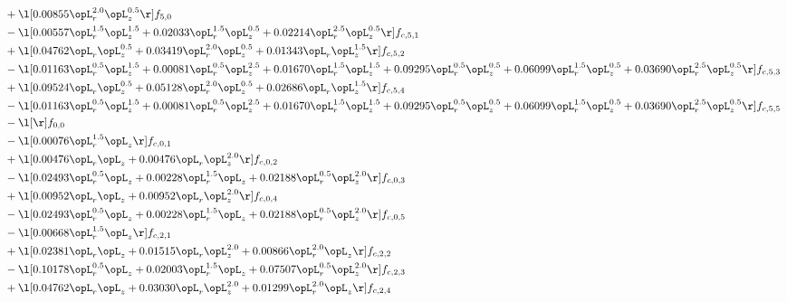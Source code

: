 \begin{alignat}{2}
& + \l[  0.00855 \opL_r^{2.0} \opL_z^{0.5}  \r] f_{5,0} \nonumber \\ 
& - \l[  0.00557 \opL_r^{1.5} \opL_z^{1.5} +  0.02033 \opL_r^{1.5} \opL_z^{0.5} +  0.02214 \opL_r^{2.5} \opL_z^{0.5}  \r] f_{c,5,1} \nonumber \\ 
& + \l[  0.04762 \opL_r \opL_z^{0.5} +  0.03419 \opL_r^{2.0} \opL_z^{0.5} +  0.01343 \opL_r \opL_z^{1.5}  \r] f_{c,5,2} \nonumber \\ 
& - \l[  0.01163 \opL_r^{0.5} \opL_z^{1.5} +  0.00081 \opL_r^{0.5} \opL_z^{2.5} +  0.01670 \opL_r^{1.5} \opL_z^{1.5} +  0.09295 \opL_r^{0.5} \opL_z^{0.5} +  0.06099 \opL_r^{1.5} \opL_z^{0.5} +  0.03690 \opL_r^{2.5} \opL_z^{0.5}  \r] f_{c,5,3} \nonumber \\ 
& + \l[  0.09524 \opL_r \opL_z^{0.5} +  0.05128 \opL_r^{2.0} \opL_z^{0.5} +  0.02686 \opL_r \opL_z^{1.5}  \r] f_{c,5,4} \nonumber \\ 
& - \l[  0.01163 \opL_r^{0.5} \opL_z^{1.5} +  0.00081 \opL_r^{0.5} \opL_z^{2.5} +  0.01670 \opL_r^{1.5} \opL_z^{1.5} +  0.09295 \opL_r^{0.5} \opL_z^{0.5} +  0.06099 \opL_r^{1.5} \opL_z^{0.5} +  0.03690 \opL_r^{2.5} \opL_z^{0.5}  \r] f_{c,5,5} \nonumber \\ 
& - \l[  \r] f_{0,0} \nonumber \\ 
& - \l[  0.00076 \opL_r^{1.5} \opL_z  \r] f_{c,0,1} \nonumber \\ 
& + \l[  0.00476 \opL_r \opL_z +  0.00476 \opL_r \opL_z^{2.0}  \r] f_{c,0,2} \nonumber \\ 
& - \l[  0.02493 \opL_r^{0.5} \opL_z +  0.00228 \opL_r^{1.5} \opL_z +  0.02188 \opL_r^{0.5} \opL_z^{2.0}  \r] f_{c,0,3} \nonumber \\ 
& + \l[  0.00952 \opL_r \opL_z +  0.00952 \opL_r \opL_z^{2.0}  \r] f_{c,0,4} \nonumber \\ 
& - \l[  0.02493 \opL_r^{0.5} \opL_z +  0.00228 \opL_r^{1.5} \opL_z +  0.02188 \opL_r^{0.5} \opL_z^{2.0}  \r] f_{c,0,5} \nonumber \\ 
& - \l[  0.00668 \opL_r^{1.5} \opL_z  \r] f_{c,2,1} \nonumber \\ 
& + \l[  0.02381 \opL_r \opL_z +  0.01515 \opL_r \opL_z^{2.0} +  0.00866 \opL_r^{2.0} \opL_z  \r] f_{c,2,2} \nonumber \\ 
& - \l[  0.10178 \opL_r^{0.5} \opL_z +  0.02003 \opL_r^{1.5} \opL_z +  0.07507 \opL_r^{0.5} \opL_z^{2.0}  \r] f_{c,2,3} \nonumber \\ 
& + \l[  0.04762 \opL_r \opL_z +  0.03030 \opL_r \opL_z^{2.0} +  0.01299 \opL_r^{2.0} \opL_z  \r] f_{c,2,4} \nonumber \\ 

\end{alignat}
